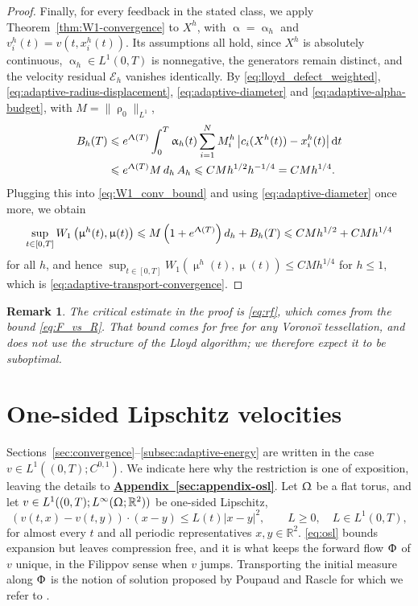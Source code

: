 \documentclass[letterpaper,11pt,twoside]{article}
\numberwithin{figure}{section}
\numberwithin{table}{section}
\theoremstyle{cpamplain}
\theoremstyle{cpamdefinition}
\newtheorem{remark}[theorem]{Remark}
\newcommand{\R}{\mathbb{R}}
\newcommand{\diff}{\mathrm{d}}
\newcommand{\Appref}[1]{\textbf{\hyperref[#1]{Appendix~\ref*{#1}}}}
\let\alpha\upalpha
\let\mu\upmu
\let\rho\uprho
\let\Lambda\Uplambda
\let\Phi\Upphi
\let\Omega\Upomega
\renewcommand{\le}{\leqslant}
\renewcommand{\ge}{\geqslant}
\numberwithin{equation}{section}
\begin{document}
\begin{proof}
Finally, for every feedback in the stated class, we apply Theorem~\ref{thm:W1-convergence} to $X^h$, with $\alpha=\alpha_h$ and $v_i^h(t)=v(t,x_i^h(t))$.
Its assumptions all hold, since $X^h$ is absolutely continuous, $\alpha_h\in L^1(0,T)$ is nonnegative, the generators remain distinct, and the velocity residual $\mathscr E_h$ vanishes identically.
By \eqref{eq:lloyd_defect_weighted}, \eqref{eq:adaptive-radius-displacement}, \eqref{eq:adaptive-diameter} and \eqref{eq:adaptive-alpha-budget}, with $M=\|\rho_0\|_{L^1}$,
\begin{align*}
B_h(T)
&\le e^{\Lambda(T)}\int_0^T\alpha_h(t)\sum_{i=1}^NM_i^h\left|c_i(X^h(t))-x_i^h(t)\right|\diff t\\
&\le e^{\Lambda(T)}M\,d_h\,A_h
\le CMh^{1/2}h^{-1/4}=CMh^{1/4}.
\end{align*}
Plugging this into \eqref{eq:W1_conv_bound} and using \eqref{eq:adaptive-diameter} once more, we obtain
\[
\sup_{t\in[0,T]}W_1\left(\mu^h(t),\mu(t)\right)
\le M\left(1+e^{\Lambda(T)}\right)d_h+B_h(T)
\le CMh^{1/2}+CMh^{1/4}
\]
for all $h$, and hence $\sup_{t\in[0,T]}W_1(\mu^h(t),\mu(t))\le CMh^{1/4}$ for $h\le1$, which is \eqref{eq:adaptive-transport-convergence}.
\end{proof}

\begin{remark}
The critical estimate in the proof is \eqref{eq:rf}, which comes from the bound \eqref{eq:F_vs_R}.
That bound comes for free for any Vorono\"i tessellation, and does not use the structure of the Lloyd algorithm; we therefore expect it to be suboptimal.
\end{remark}


\section{One-sided Lipschitz velocities}\label{sec:osl}

Sections~\ref{sec:convergence}--\ref{subsec:adaptive-energy} are written in the case $v\in L^1((0,T);C^{0,1})$. We indicate here why the restriction is one of exposition, leaving the details to \Appref{sec:appendix-osl}.
Let $\Omega$ be a flat torus, and let $v\in L^1((0,T);L^\infty(\Omega;\R^2))$ be one-sided Lipschitz,
\begin{equation}\label{eq:osl}
\left(v(t,x)-v(t,y)\right)\cdot(x-y)\le L(t)|x-y|^2,
\qquad L\ge0,\quad L\in L^1(0,T),
\end{equation}
for almost every $t$ and all periodic representatives $x,y\in\R^2$. \eqref{eq:osl} bounds expansion but leaves compression free, and it is what keeps the forward flow $\Phi$ of $v$ unique, in the Filippov sense when $v$ jumps.
Transporting the initial measure along $\Phi$ is the notion of solution proposed by Poupaud and Rascle \cite{PoupaudRascle1997} for which we refer to \cite{bouja,LionsSeeger2024,DelarueLagoutiereVauchelet2017}.
\end{document}

